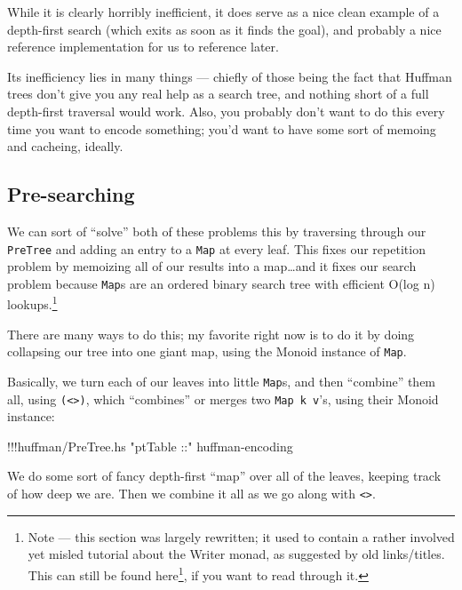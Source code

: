 \documentclass[]{article}
\newenvironment{Shaded}{}{}
\newcommand{\StringTok}[1]{\textcolor[rgb]{0.25,0.44,0.63}{{#1}}}
\newcommand{\FunctionTok}[1]{\textcolor[rgb]{0.02,0.16,0.49}{{#1}}}
\newcommand{\NormalTok}[1]{{#1}}
\renewcommand{\href}[2]{#2\footnote{\url{#1}}}
\begin{document}
While it is clearly horribly inefficient, it does serve as a nice clean
example of a depth-first search (which exits as soon as it finds the
goal), and probably a nice reference implementation for us to reference
later.

Its inefficiency lies in many things --- chiefly of those being the fact
that Huffman trees don't give you any real help as a search tree, and
nothing short of a full depth-first traversal would work. Also, you
probably don't want to do this every time you want to encode something;
you'd want to have some sort of memoing and cacheing, ideally.

\subsection{Pre-searching}\label{pre-searching}

We can sort of ``solve'' both of these problems this by traversing
through our \texttt{PreTree} and adding an entry to a \texttt{Map} at
every leaf. This fixes our repetition problem by memoizing all of our
results into a map\ldots{}and it fixes our search problem because
\texttt{Map}s are an ordered binary search tree with efficient O(log n)
lookups.\footnote{Note --- this section was largely rewritten; it used
  to contain a rather involved yet misled tutorial about the Writer
  monad, as suggested by old links/titles. This can
  \href{https://github.com/mstksg/inCode/blob/master/copy/entries/.huffman-2-writer.md}{still
  be found here}, if you want to read through it.}

There are many ways to do this; my favorite right now is to do it by
doing collapsing our tree into one giant map, using the Monoid instance
of \texttt{Map}.

Basically, we turn each of our leaves into little \texttt{Map}s, and
then ``combine'' them all, using \texttt{(\textless{}\textgreater{})},
which ``combines'' or merges two \texttt{Map\ k\ v}'s, using their
Monoid instance:

\begin{Shaded}
\begin{Highlighting}[]
\FunctionTok{!!!}\NormalTok{huffman}\FunctionTok{/}\NormalTok{PreTree.hs }\StringTok{"ptTable ::"} \NormalTok{huffman}\FunctionTok{-}\NormalTok{encoding}
\end{Highlighting}
\end{Shaded}

We do some sort of fancy depth-first ``map'' over all of the leaves,
keeping track of how deep we are. Then we combine it all as we go along
with \texttt{\textless{}\textgreater{}}.
\end{document}
